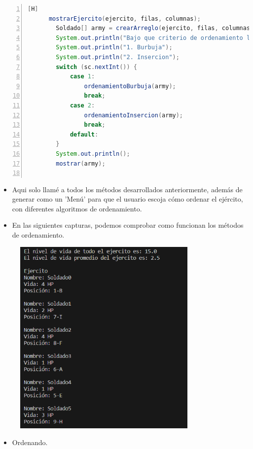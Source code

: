 \documentclass{article}
\begin{document}
	\begin{lstlisting}[language=java,caption={Metodo main (final)}, numbers=left][H]
	  mostrarEjercito(ejercito, filas, columnas);
        Soldado[] army = crearArreglo(ejercito, filas, columnas);
        System.out.println("Bajo que criterio de ordenamiento le gustaria ordenar el arreglo?");
        System.out.println("1. Burbuja");
        System.out.println("2. Insercion");
        switch (sc.nextInt()) {
            case 1:
                ordenamientoBurbuja(army);
                break;
            case 2:
                ordenamientoInsercion(army);
                break;
            default:
        }
        System.out.println();
        mostrar(army);
    
	\end{lstlisting}
	
	\begin{itemize}	
		\item Aqui solo llamé a todos los métodos desarrollados anteriormente, además de generar como un 'Menú' para que el usuario escoja cómo ordenar el ejército, con diferentes algoritmos de ordenamiento.
		\item En las siguientes capturas, podemos comprobar como funcionan los métodos de ordenamiento.
	\end{itemize}
	
	\begin{figure}[H]
		\centering
		\includegraphics[width=0.8\textwidth,keepaspectratio]{img/captura3.png}
	\end{figure}
	\begin{itemize}
		\item Ordenando.
	\end{itemize}
	
\end{document}
